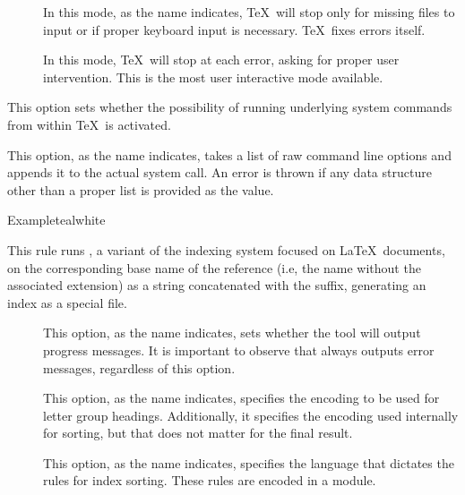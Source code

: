 \begin{description}
\begin{description}
\begin{description}
\item[] In this mode, as the name indicates, \TeX\ will stop only for missing files to input or if proper keyboard input is necessary. \TeX\ fixes errors itself.

\item[] In this mode, \TeX\ will stop at each error, asking for proper user intervention. This is the most user interactive mode available.
\end{description}

\item[\rpsbox{shell}] This option sets whether the possibility of running underlying system commands from within \TeX\ is activated.

\item[\abox{options}] This option, as the name indicates, takes a list of raw command line options and appends it to the actual system call. An error is thrown if any data structure other than a proper list is provided as the value.
\end{description}

\begin{codebox}{Example}{teal}{\icnote}{white}
\end{codebox}

\item[\rulebox{texindy}{Nicola Talbot, Paulo Cereda}] This rule runs , a variant of the  indexing system focused on \LaTeX\ documents, on the corresponding base name of the  reference (i.e, the name without the associated extension) as a string concatenated with the  suffix, generating an index as a special  file.

\begin{description}
\item[] This option, as the name indicates, sets whether the tool will output progress messages. It is important to observe that  always outputs error messages, regardless of this option.

\item[] This option, as the name indicates, specifies the encoding to be used for letter group headings. Additionally, it specifies the encoding used internally for sorting, but that does not matter for the final result.

\item[] This option, as the name indicates, specifies the language that dictates the rules for index sorting. These rules are encoded in a module.


\end{description}
\end{description}
